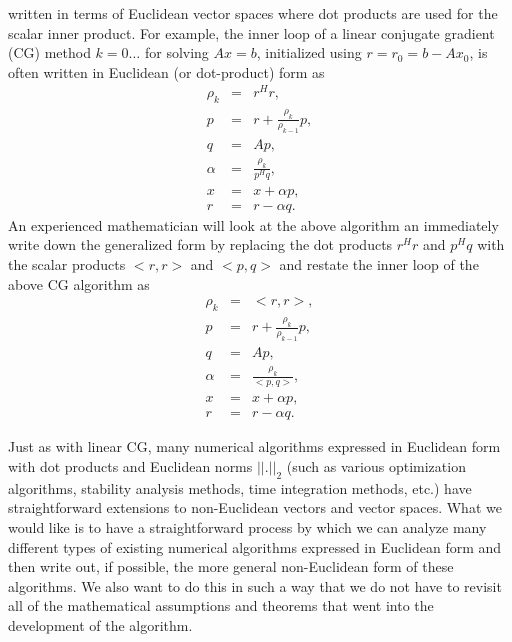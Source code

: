 \documentclass[pdf,ps2pdf,11pt]{SANDreport}
\begin{document}
written in terms of Euclidean vector spaces where dot products are used for
the scalar inner product.  For example, the inner loop of a linear conjugate
gradient (CG) method $k=0\ldots{}$ for solving $A x = b$, initialized using $r
= r_0 = b - A x_0$, is often written in Euclidean (or dot-product) form as
%
\begin{eqnarray*}
\rho_k & = & r^H r, \\
p & = & r + \frac{\rho_k}{\rho_{k-1}} p, \\
q & = & A p, \\
\alpha & = & \frac{\rho_k}{p^H q}, \\
x & = & x + \alpha p, \\
r & = & r - \alpha q.
\end{eqnarray*}
%
An experienced mathematician will look at the above algorithm an immediately
write down the generalized form by replacing the dot products $r^H r$ and $p^H
q$ with the scalar products $<r,r>$ and $<p,q>$ and restate the inner loop of
the above CG algorithm as
%
\begin{eqnarray*}
\rho_k & = & <r,r>, \\
p & = & r + \frac{\rho_k}{\rho_{k-1}} p, \\
q & = & A p, \\
\alpha & = & \frac{\rho_k}{<p,q>}, \\
x & = & x + \alpha p, \\
r & = & r - \alpha q.
\end{eqnarray*}
%

Just as with linear CG, many numerical algorithms expressed in Euclidean form
with dot products and Euclidean norms $||.||_2$ (such as various optimization
algorithms, stability analysis methods, time integration methods, etc.) have
straightforward extensions to non-Euclidean vectors and vector spaces.  What we
would like is to have a straightforward process by which we can analyze many
different types of existing numerical algorithms expressed in Euclidean form
and then write out, if possible, the more general non-Euclidean form of these
algorithms.  We also want to do this in such a way that we do not have to
revisit all of the mathematical assumptions and theorems that went into the
development of the algorithm.
\end{document}
